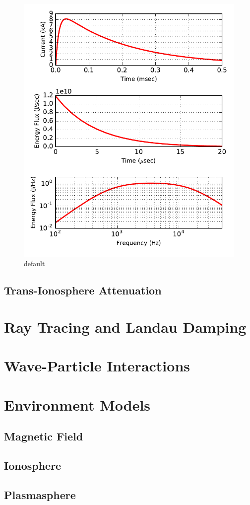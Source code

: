 \begin{figure}[ht]
\begin{center}
\includegraphics{figures/Lightning_spectra.pdf}

\caption{default}
\label{fig:lightning_spectrum}
\end{center}
\end{figure}

\subsection{Trans-Ionosphere Attenuation}

\section{Ray Tracing and Landau Damping}
\section{Wave-Particle Interactions}
\section{Environment Models}
\subsection{Magnetic Field}
\subsection{Ionosphere}
\subsection{Plasmasphere}
